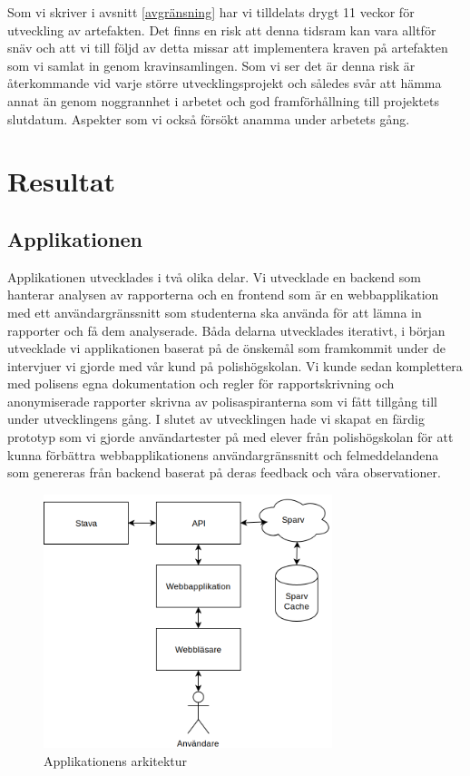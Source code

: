 \documentclass[swedish]{maucsthesis}
\begin{document}
Som vi skriver i avsnitt \ref{avgränsning} har vi tilldelats drygt 11 veckor
för utveckling av artefakten. Det finns en risk att denna tidsram kan vara
alltför snäv och att vi till följd av detta missar att implementera kraven på
artefakten som vi samlat in genom kravinsamlingen. Som vi ser det är denna risk
är återkommande vid varje större utvecklingsprojekt och således svår att hämma
annat än genom noggrannhet i arbetet och god framförhållning till projektets
slutdatum. Aspekter som vi också försökt anamma under arbetets gång.


\section{Resultat}
\subsection{Applikationen}\label{applikationen}

Applikationen utvecklades i två olika delar. Vi utvecklade en backend som hanterar
analysen av rapporterna och en frontend som är en webbapplikation med ett
användargränssnitt som studenterna ska använda för att lämna in
rapporter och få dem analyserade. Båda delarna utvecklades iterativt, i
början utvecklade vi applikationen baserat på de önskemål som framkommit under
de intervjuer vi gjorde med vår kund på polishögskolan. Vi kunde sedan komplettera
med polisens egna dokumentation och regler för rapportskrivning och
anonymiserade rapporter skrivna av polisaspiranterna som vi fått tillgång till
under utvecklingens gång. I slutet av utvecklingen hade vi skapat en färdig
prototyp som vi gjorde användartester på med elever från polishögskolan för att
kunna förbättra webbapplikationens användargränssnitt och felmeddelandena som
genereras från backend baserat på deras feedback och våra observationer.

\begin{figure}[H]
    \centering
    \includegraphics[width=0.75\textwidth]{architecture.png}
    \caption{Applikationens arkitektur}
    \label{fig:architecture}
\end{figure}
\end{document}
